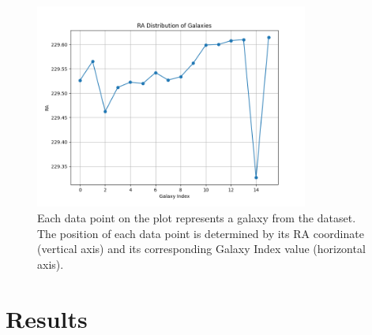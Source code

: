 \documentclass{article}
\begin{document}
\begin{figure}
    \centering
    \includegraphics[width=0.8\textwidth]{Figure_2.png}
    \caption{Each data point on the plot represents a galaxy from the dataset. The position of each data point is determined by its RA coordinate (vertical axis) and its corresponding Galaxy Index value (horizontal axis).}
    \label{fig:figure2}
\end{figure}

\section{Results}

\begin{thebibliography}{9}
\end{thebibliography}
\end{document}
